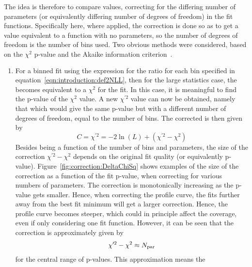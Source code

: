 The idea is therefore to compare \nll values,
correcting for the differing number of parameters 
(or equivalently differing number of degrees of freedom) in
the fit functions. Specifically here, where applied, the correction is
done so as to get a value equivalent to a function with no parameters, so
the number of degrees of freedom is the number of bins used.
Two obvious methods were considered, based on the 
$\chi^2$ p-value and the Akaike information 
criterion~\cite{ref:correction:akaike}.
\begin{enumerate}
\item %
For a binned fit using the expression for the \nll ratio
for each bin specified in equation~\ref{eqn:introduction:def2NLL}, then for
the large statistics case, the \nll becomes equivalent to a $\chi^2$ for the
fit. In this case, it is meaningful to find the p-value of the $\chi^2$ value.
A new $\chi^{\prime 2}$
value can now be obtained, namely that which would give the same p-value but
with a different number of degrees of freedom, equal to the number of bins.
The corrected \nll is then given by
\begin{displaymath}
C = \chi^{\prime 2} = - 2\ln(L) + (\chi^{\prime 2} - \chi^2)
\end{displaymath}
Besides being a function of the number of bins and parameters,
the size of the correction $\chi^{\prime 2} - \chi^2$
depends on the original fit quality
(or equivalently p-value). Figure~\ref{fig:correction:DeltaChiSq}
shows examples of the size of the correction as a function of the
fit p-value, when correcting for various numbers of parameters.
The correction is monotonically increasing as the p-value gets smaller.
Hence, when correcting the \nll profile curve, the fits further away from
the best fit minimum will get a larger correction. Hence, the profile curve
becomes steeper, which could in principle affect the coverage, even if
only considering one fit function.
However, it can be seen that the correction is approximately given by
\begin{displaymath}
\chi^{\prime 2} - \chi^2 \approx N_{\rm par}
\end{displaymath}
for the central range of p-values. This approximation means the 

\end{enumerate}
